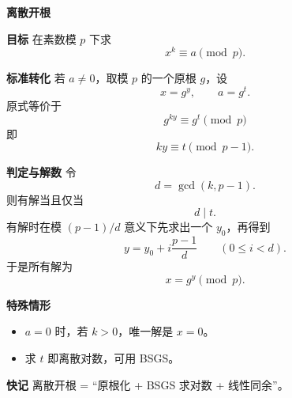 \textbf{离散开根}

\textbf{目标}
在素数模 $p$ 下求
\[
x^k\equiv a\pmod p.
\]

\textbf{标准转化}
若 $a\ne 0$，取模 $p$ 的一个原根 $g$，设
\[
x=g^y,\qquad a=g^t.
\]
原式等价于
\[
g^{ky}\equiv g^t\pmod p
\]
即
\[
ky\equiv t\pmod{p-1}.
\]

\textbf{判定与解数}
令
\[
d=\gcd(k,p-1).
\]
则有解当且仅当
\[
d\mid t.
\]
有解时在模 $(p-1)/d$ 意义下先求出一个 $y_0$，再得到
\[
y=y_0+i\frac{p-1}{d}\qquad (0\le i<d).
\]
于是所有解为
\[
x=g^y \pmod p.
\]

\textbf{特殊情形}
\begin{itemize}
\item $a=0$ 时，若 $k>0$，唯一解是 $x=0$。
\item 求 $t$ 即离散对数，可用 BSGS。
\end{itemize}

\textbf{快记}
离散开根 = “原根化 + BSGS 求对数 + 线性同余”。
